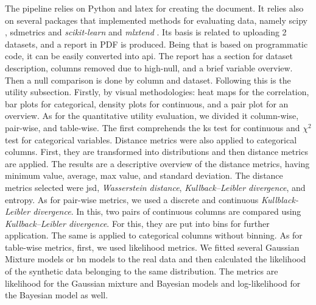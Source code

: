 The pipeline relies on Python and latex for creating the document. It relies also on several packages that implemented methods for evaluating data, namely scipy \cite{scipy}, sdmetrics \cite{sdv} and \textit{scikit-learn} \cite{scikit-learn} and \textit{mlxtend} \cite{mlxtend}. Its basis is related to uploading 2 datasets, and a report in PDF is produced. Being that is based on programmatic code, it can be easily converted into \ac{api}.
The report has a section for dataset description, columns removed due to high-null, and a brief variable overview. Then a null comparison is done by column and dataset. Following this is the utility subsection. Firstly, by visual methodologies: heat maps for the correlation, bar plots for categorical, density plots for continuous, and a pair plot for an overview. As for the quantitative utility evaluation, we divided it column-wise, pair-wise, and table-wise. The first comprehends the \ac{ks} test for continuous and $\chi^2$ test for categorical variables.  Distance metrics were also applied to categorical columns. First, they are transformed into distributions and then distance metrics are applied. The results are a descriptive overview of the distance metrics, having minimum value, average, max value, and standard deviation. The distance metrics selected were \ac{jsd}, \textit{Wasserstein distance}, \textit{Kullback–Leibler divergence}, and entropy.
As for pair-wise metrics, we used a discrete and continuous \textit{Kullblack-Leibler divergence}. In this, two pairs of continuous columns are compared using \textit{Kullback–Leibler divergence}. For this, they are put into bins for further application. The same is applied to categorical columns without binning.
As for table-wise metrics, first, we used likelihood metrics. We fitted several Gaussian Mixture models or \ac{bn} models to the real data and then calculated the likelihood of the synthetic data belonging to the same distribution. The metrics are likelihood for the Gaussian mixture and Bayesian models and log-likelihood for the Bayesian model as well.

